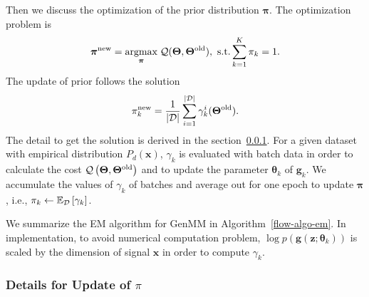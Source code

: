 Then we discuss the optimization of the prior distribution $\bm{\pi}$. The optimization problem is 
\begin{equation}\label{eq-pi-update1}
  \bm{\pi}^{\mathrm{new}} = \underset{\bm{\pi}}{\operatorname{argmax}}\;{ \mathcal{Q}
    (\bm{\Theta},\bm{\Theta}^{\mathrm{old}})}, \,\,
  \mathrm{s.t.} \sum_{k=1}^{K}\pi_k = 1.
\end{equation}
The update of prior follows the solution
\begin{equation}\label{eq-pi-solution}
  \pi_k^{\mathrm{new}} = \frac{1}{| \mathcal{D} |}\sum_{i=1}^{| \mathcal{D} |}\gamma_k^{i}(\bm{\Theta}^{\mathrm{old}}).
\end{equation}
The detail to get the solution is derived in the section~\ref{subsubsec:Proof_for_update}. For a given dataset with empirical distribution $P_d(\bm{x})$,
$\gamma_k$ is evaluated with batch data in order to calculate the cost
$\mathcal{Q}\left(\bm{\Theta},\bm{\Theta}^{\mathrm{old}}\right)$ and to update the
parameter $\bm{\theta}_k$ of $\bm{g}_k$. We accumulate the values of $\gamma_k$ of batches and
average out for one epoch to update $\bm{\pi}$, {i.e.}, $\pi_k \gets \mathbb{E}_{\mathcal{D}}\left[ \gamma_k \right]$.



We summarize the EM algorithm for GenMM in Algorithm~\autoref{flow-algo-em}.
In implementation, to avoid numerical computation problem, $\log{p(\bm{g}(\bm{z}; \bm{\theta}_k))}$ is
scaled by the dimension of signal $\bm{x}$ in order to compute $\gamma_k$. 

\subsubsection{Details for Update of $\pi$}
\label{subsubsec:Proof_for_update}


